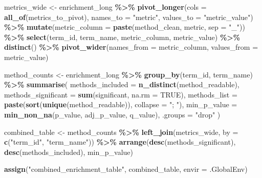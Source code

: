 \documentclass[
]{article}
\newenvironment{Shaded}{\begin{snugshade}}{\end{snugshade}}
\newcommand{\AttributeTok}[1]{\textcolor[rgb]{0.13,0.29,0.53}{#1}}
\newcommand{\ConstantTok}[1]{\textcolor[rgb]{0.56,0.35,0.01}{#1}}
\newcommand{\FunctionTok}[1]{\textcolor[rgb]{0.13,0.29,0.53}{\textbf{#1}}}
\newcommand{\NormalTok}[1]{#1}
\newcommand{\OtherTok}[1]{\textcolor[rgb]{0.56,0.35,0.01}{#1}}
\newcommand{\SpecialCharTok}[1]{\textcolor[rgb]{0.81,0.36,0.00}{\textbf{#1}}}
\newcommand{\StringTok}[1]{\textcolor[rgb]{0.31,0.60,0.02}{#1}}
\begin{document}
\begin{Shaded}
\begin{Highlighting}[]
\NormalTok{  metrics\_wide }\OtherTok{\textless{}{-}}\NormalTok{ enrichment\_long }\SpecialCharTok{\%\textgreater{}\%}
    \FunctionTok{pivot\_longer}\NormalTok{(}\AttributeTok{cols =} \FunctionTok{all\_of}\NormalTok{(metrics\_to\_pivot), }\AttributeTok{names\_to =} \StringTok{"metric"}\NormalTok{, }\AttributeTok{values\_to =} \StringTok{"metric\_value"}\NormalTok{) }\SpecialCharTok{\%\textgreater{}\%}
    \FunctionTok{mutate}\NormalTok{(}\AttributeTok{metric\_column =} \FunctionTok{paste}\NormalTok{(method\_clean, metric, }\AttributeTok{sep =} \StringTok{"\_"}\NormalTok{)) }\SpecialCharTok{\%\textgreater{}\%}
    \FunctionTok{select}\NormalTok{(term\_id, term\_name, metric\_column, metric\_value) }\SpecialCharTok{\%\textgreater{}\%}
    \FunctionTok{distinct}\NormalTok{() }\SpecialCharTok{\%\textgreater{}\%}
    \FunctionTok{pivot\_wider}\NormalTok{(}\AttributeTok{names\_from =}\NormalTok{ metric\_column, }\AttributeTok{values\_from =}\NormalTok{ metric\_value)}

\NormalTok{  method\_counts }\OtherTok{\textless{}{-}}\NormalTok{ enrichment\_long }\SpecialCharTok{\%\textgreater{}\%}
    \FunctionTok{group\_by}\NormalTok{(term\_id, term\_name) }\SpecialCharTok{\%\textgreater{}\%}
    \FunctionTok{summarise}\NormalTok{(}
      \AttributeTok{methods\_included =} \FunctionTok{n\_distinct}\NormalTok{(method\_readable),}
      \AttributeTok{methods\_significant =} \FunctionTok{sum}\NormalTok{(significant, }\AttributeTok{na.rm =} \ConstantTok{TRUE}\NormalTok{),}
      \AttributeTok{methods\_list =} \FunctionTok{paste}\NormalTok{(}\FunctionTok{sort}\NormalTok{(}\FunctionTok{unique}\NormalTok{(method\_readable)), }\AttributeTok{collapse =} \StringTok{"; "}\NormalTok{),}
      \AttributeTok{min\_p\_value =} \FunctionTok{min\_non\_na}\NormalTok{(p\_value, adj\_p\_value, q\_value),}
      \AttributeTok{.groups =} \StringTok{"drop"}
\NormalTok{    )}

\NormalTok{  combined\_table }\OtherTok{\textless{}{-}}\NormalTok{ method\_counts }\SpecialCharTok{\%\textgreater{}\%}
    \FunctionTok{left\_join}\NormalTok{(metrics\_wide, }\AttributeTok{by =} \FunctionTok{c}\NormalTok{(}\StringTok{"term\_id"}\NormalTok{, }\StringTok{"term\_name"}\NormalTok{)) }\SpecialCharTok{\%\textgreater{}\%}
    \FunctionTok{arrange}\NormalTok{(}\FunctionTok{desc}\NormalTok{(methods\_significant), }\FunctionTok{desc}\NormalTok{(methods\_included), min\_p\_value)}

  \FunctionTok{assign}\NormalTok{(}\StringTok{"combined\_enrichment\_table"}\NormalTok{, combined\_table, }\AttributeTok{envir =}\NormalTok{ .GlobalEnv)}


\end{Highlighting}
\end{Shaded}
\end{document}
